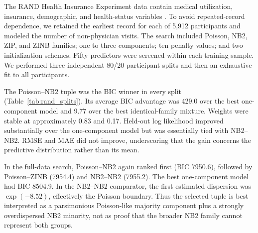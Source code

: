 \documentclass[11pt]{article}
\begin{document}
The RAND Health Insurance Experiment data contain medical utilization,
insurance, demographic, and health-status variables
\citep{deb2002health,cameron2005microeconometrics}.  To avoid repeated-record
dependence, we retained the earliest record for each of 5,912 participants and
modeled the number of non-physician visits.  The search included Poisson, NB2,
ZIP, and ZINB families; one to three components; ten penalty values; and two
initialization schemes.  Fifty predictors were screened within each training
sample.  We performed three independent 80/20 participant splits and then an
exhaustive fit to all participants.

The Poisson--NB2 tuple was the BIC winner in every split
(Table~\ref{tab:rand_splits}).  Its average BIC advantage was 429.0 over the
best one-component model and 9.77 over the best identical-family mixture.
Weights were stable at approximately 0.83 and 0.17.  Held-out log likelihood
improved substantially over the one-component model but was essentially tied
with NB2--NB2.  RMSE and MAE did not improve, underscoring that the gain concerns
the predictive distribution rather than its mean.

\begin{table}[t]
\centering
\caption{RAND split validation for the BIC-selected Poisson--NB2 mixture.
Log score is held-out average log likelihood per participant.  The BIC
improvement columns are positive when Poisson--NB2 improves on the indicated
comparator.}
\label{tab:rand_splits}
\small
{}
\end{table}

In the full-data search, Poisson--NB2 again ranked first (BIC 7950.6), followed
by Poisson--ZINB (7954.4) and NB2--NB2 (7955.2).  The best one-component model
had BIC 8504.9.  In the NB2--NB2 comparator, the first estimated dispersion was
\(\exp(-8.52)\), effectively the Poisson boundary.  Thus the selected tuple
is best interpreted as a parsimonious Poisson-like majority component plus a
strongly overdispersed NB2 minority, not as proof that the broader NB2 family
cannot represent both groups.
\end{document}
